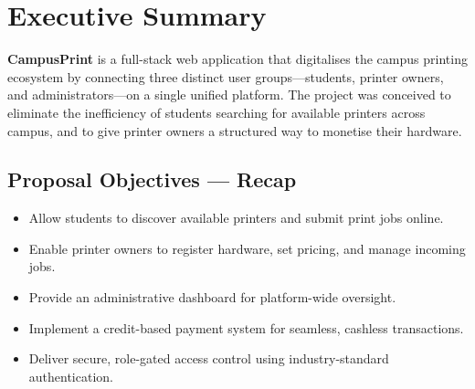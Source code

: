\documentclass[12pt,a4paper]{report}
\begin{document}
\chapter{Executive Summary}

\textbf{CampusPrint} is a full-stack web application that digitalises the campus printing
ecosystem by connecting three distinct user groups—students, printer owners, and
administrators—on a single unified platform. The project was conceived to eliminate the
inefficiency of students searching for available printers across campus, and to give printer
owners a structured way to monetise their hardware.

\section*{Proposal Objectives — Recap}
\begin{itemize}[leftmargin=2em]
  \item Allow students to discover available printers and submit print jobs online.
  \item Enable printer owners to register hardware, set pricing, and manage incoming jobs.
  \item Provide an administrative dashboard for platform-wide oversight.
  \item Implement a credit-based payment system for seamless, cashless transactions.
  \item Deliver secure, role-gated access control using industry-standard authentication.
\end{itemize}
\end{document}
